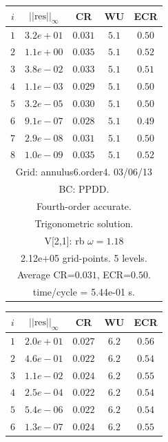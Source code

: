 \begin{table}[hbt]
\begin{center}
{\tablefontsize
\begin{tabular}{|c|c|c|c|c|} \hline 
 $i$   & $\vert\vert\mbox{res}\vert\vert_\infty$  &  CR     &  WU    & ECR  \\   \hline 
 $ 1$  & $ 3.2e+01$ & $0.031$ & $ 5.1$ & $0.50$ \\ 
 $ 2$  & $ 1.1e+00$ & $0.035$ & $ 5.1$ & $0.52$ \\ 
 $ 3$  & $ 3.8e-02$ & $0.033$ & $ 5.1$ & $0.51$ \\ 
 $ 4$  & $ 1.1e-03$ & $0.029$ & $ 5.1$ & $0.50$ \\ 
 $ 5$  & $ 3.2e-05$ & $0.030$ & $ 5.1$ & $0.50$ \\ 
 $ 6$  & $ 9.1e-07$ & $0.028$ & $ 5.1$ & $0.49$ \\ 
 $ 7$  & $ 2.9e-08$ & $0.031$ & $ 5.1$ & $0.50$ \\ 
 $ 8$  & $ 1.0e-09$ & $0.035$ & $ 5.1$ & $0.52$ \\ 
\hline 
\multicolumn{5}{|c|}{Grid: annulus6.order4. 03/06/13}  \\
\multicolumn{5}{|c|}{BC: PPDD.}  \\
\multicolumn{5}{|c|}{Fourth-order accurate.}  \\
\multicolumn{5}{|c|}{Trigonometric solution.}  \\
\multicolumn{5}{|c|}{V[2,1]: rb $\omega=1.18$}  \\
\multicolumn{5}{|c|}{2.12e+05 grid-points. 5 levels.}  \\
\multicolumn{5}{|c|}{Average CR=$0.031$, ECR=$0.50$.}  \\
\multicolumn{5}{|c|}{time/cycle = 5.44e-01 s.}  \\
\hline 
\end{tabular}
\begin{tabular}{|c|c|c|c|c|} \hline 
 $i$   & $\vert\vert\mbox{res}\vert\vert_\infty$  &  CR     &  WU    & ECR  \\   \hline 
 $ 1$  & $ 2.0e+01$ & $0.027$ & $ 6.2$ & $0.56$ \\ 
 $ 2$  & $ 4.6e-01$ & $0.022$ & $ 6.2$ & $0.54$ \\ 
 $ 3$  & $ 1.1e-02$ & $0.024$ & $ 6.2$ & $0.55$ \\ 
 $ 4$  & $ 2.5e-04$ & $0.022$ & $ 6.2$ & $0.54$ \\ 
 $ 5$  & $ 5.4e-06$ & $0.022$ & $ 6.2$ & $0.54$ \\ 
 $ 6$  & $ 1.3e-07$ & $0.024$ & $ 6.2$ & $0.55$ \\ 

\end{tabular}}
\end{center}
\end{table}
